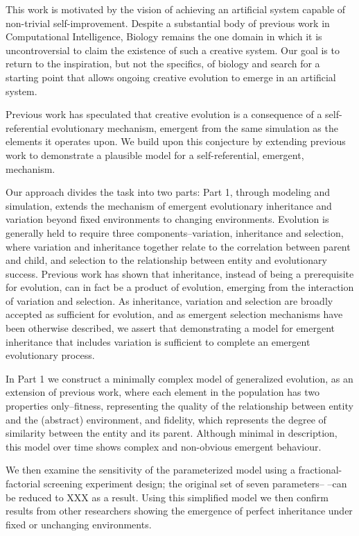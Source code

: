 \documentclass[]{report}
\title{}
\author{}
\begin{document}
This work is motivated by the vision of achieving an artificial system capable of non-trivial self-improvement. Despite a substantial body of previous work in Computational Intelligence, Biology remains the one domain in which it is uncontroversial to claim the existence of such a creative system. Our goal is to return to the inspiration, but not the specifics, of biology and search for a starting point that allows ongoing creative evolution to emerge in an artificial system. 

Previous work has speculated that creative evolution is a consequence of a self-referential evolutionary mechanism, emergent from the same simulation as the elements it operates upon. We build upon this conjecture by extending previous work to demonstrate a plausible model for a self-referential, emergent, mechanism.

Our approach divides the task into two parts: Part 1, through modeling and simulation, extends the mechanism of emergent evolutionary inheritance and variation beyond fixed environments to changing environments. Evolution is generally held to require three components--variation, inheritance and selection, where variation and inheritance together relate to the correlation between parent and child, and selection to the relationship between entity and evolutionary success. Previous work has shown that inheritance, instead of being a prerequisite for evolution, can in fact be a product of evolution, emerging from the interaction of variation and selection. As inheritance, variation and selection are broadly accepted as sufficient for evolution, and as emergent selection mechanisms have been otherwise described, we assert that demonstrating a model for emergent inheritance that includes variation is sufficient to complete an emergent evolutionary process. 

In Part 1 we construct a minimally complex model of generalized evolution, as an extension of previous work, where each element in the population has two properties only--fitness, representing the quality of the relationship between entity and the (abstract) environment, and fidelity, which represents the degree of similarity between the entity and its parent. Although minimal in description, this model over time shows complex and non-obvious emergent behaviour.

We then examine the sensitivity of the parameterized model using a fractional-factorial screening experiment design; the original set of seven parameters-- --can be reduced to XXX as a result. Using this simplified model we then confirm results from other researchers showing the emergence of perfect inheritance under fixed or unchanging environments.
\end{document}
